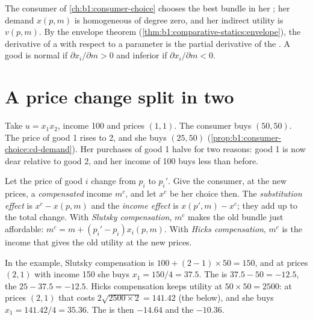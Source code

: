 \begin{recall}
The consumer of \cref{ch:b1:consumer-choice} chooses the best bundle in her
; her demand $x(p, m)$ is homogeneous of degree zero, and her
indirect utility is $v(p, m)$. By the envelope theorem
(\cref{thm:b1:comparative-statics:envelope}), the derivative of a  with respect to a parameter is the partial derivative of the
. A good is normal if $\partial x_i/\partial m > 0$ and inferior if
$\partial x_i/\partial m < 0$.
\end{recall}

\section{A price change split in two}\label{sec:b1:income-and-substitution-effects:split}

Take $u = x_1x_2$, income 100 and prices $(1, 1)$. The consumer buys
$(50, 50)$. The price of good 1 rises to 2, and she buys $(25, 50)$
(\cref{prop:b1:consumer-choice:cd-demand}). Her purchases of good 1 halve
for two reasons: good 1 is now dear relative to good 2, and her income of
100 buys less than before.

\begin{definition}\label{def:b1:income-and-substitution-effects:effects}
Let the price of good $i$ change from $p_i$ to $p_i'$. Give the consumer, at
the new prices, a \emph{compensated} income $m^c$, and let $x^c$ be her choice
then. The \emph{substitution effect} is $x^c - x(p, m)$ and the \emph{income
effect} is $x(p', m) - x^c$; they add up to the total change. With
\emph{Slutsky compensation}, $m^c$ makes the old bundle just affordable:
$m^c = m + (p_i' - p_i)x_i(p, m)$. With \emph{Hicks compensation}, $m^c$ is
the income that gives the old utility at the new prices.
\end{definition}

In the example, Slutsky compensation is $100 + (2 - 1) \times 50 = 150$, and at
prices $(2, 1)$ with income 150 she buys $x_1 = 150/4 = 37.5$. The
 is $37.5 - 50 = -12.5$, the 
$25 - 37.5 = -12.5$. Hicks compensation keeps utility at $50 \times 50 = 2500$:
at prices $(2, 1)$ that costs $2\sqrt{2500 \times 2} = 141.42$ (the
 below), and she buys $x_1 = 141.42/4 = 35.36$. The
 is then $-14.64$ and the  $-10.36$.

